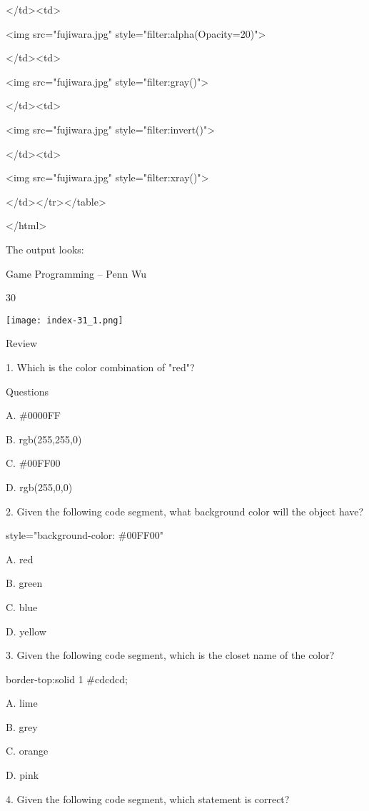 \documentclass[
]{article}
\begin{document}
\textless/td\textgreater\textless td\textgreater{}

\textless img src="fujiwara.jpg"
style="filter:alpha(Opacity=20)"\textgreater{}

\textless/td\textgreater\textless td\textgreater{}

\textless img src="fujiwara.jpg" style="filter:gray()"\textgreater{}

\textless/td\textgreater\textless td\textgreater{}

\textless img src="fujiwara.jpg" style="filter:invert()"\textgreater{}

\textless/td\textgreater\textless td\textgreater{}

\textless img src="fujiwara.jpg" style="filter:xray()"\textgreater{}

\textless/td\textgreater\textless/tr\textgreater\textless/table\textgreater{}

\textless/html\textgreater{}

The output looks:

Game Programming -- Penn Wu

30

\protect\hypertarget{index_split_003.htmlux5cux23p31}{}{}\texttt{[image: index-31\_1.png]}

Review

1. Which is the color combination of "red"?

Questions

A. \#0000FF

B. rgb(255,255,0)

C. \#00FF00

D. rgb(255,0,0)

2. Given the following code segment, what background color will the
object have?

style="background-color: \#00FF00"

A. red

B. green

C. blue

D. yellow

3. Given the following code segment, which is the closet name of the
color?

border-top:solid 1 \#cdcdcd;

A. lime

B. grey

C. orange

D. pink

4. Given the following code segment, which statement is correct?
\end{document}
